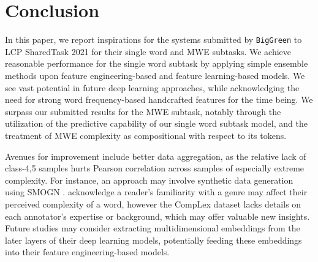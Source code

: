 \documentclass[11pt,a4paper]{article}
\begin{document}
\section{Conclusion}

In this paper, we report inspirations for the systems submitted by \texttt{BigGreen} to LCP SharedTask 2021 for their single word and MWE subtasks. We achieve  reasonable performance for the single word subtask by applying simple ensemble methods upon feature engineering-based and feature learning-based models. We see vast potential in future deep learning approaches, while acknowledging the need for strong word frequency-based handcrafted features for the time being. We surpass our submitted results for the MWE subtask, notably through the utilization of the predictive capability of our single word subtask model, and the treatment of MWE complexity as compositional with respect to its tokens.

Avenues for improvement include better data aggregation, as the relative lack of class-4,5 samples hurts Pearson correlation across samples of especially extreme complexity. For instance, an approach may involve synthetic data generation using SMOGN \citep{pmlr-v74-branco17a}. \citet{shardlow2020complex} acknowledge a reader's familiarity with a genre may affect their perceived complexity of a word, however the CompLex dataset lacks details on each annotator's expertise or background, which may offer valuable new insights. Future studies may consider extracting multidimensional embeddings from the later layers of their deep learning models, potentially feeding these embeddings into their feature engineering-based models.




\end{document}
